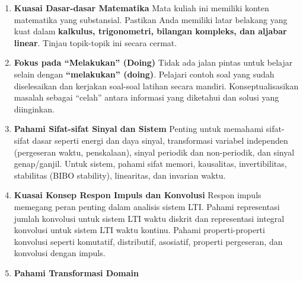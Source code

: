 \documentclass[
  letterpaper,
  DIV=11,
  numbers=noendperiod]{scrreprt}
\begin{document}
\begin{enumerate}
\def\labelenumi{\arabic{enumi}.}
\item
  \textbf{Kuasai Dasar-dasar Matematika} Mata kuliah ini memiliki konten
  matematika yang substansial. Pastikan Anda memiliki latar belakang
  yang kuat dalam \textbf{kalkulus, trigonometri, bilangan kompleks, dan
  aljabar linear}. Tinjau topik-topik ini secara cermat.
\item
  \textbf{Fokus pada ``Melakukan'' (Doing)} Tidak ada jalan pintas untuk
  belajar selain dengan \textbf{``melakukan'' (doing)}. Pelajari contoh
  soal yang sudah diselesaikan dan kerjakan soal-soal latihan secara
  mandiri. Konseptualisasikan masalah sebagai ``celah'' antara informasi
  yang diketahui dan solusi yang diinginkan.
\item
  \textbf{Pahami Sifat-sifat Sinyal dan Sistem} Penting untuk memahami
  sifat-sifat dasar seperti energi dan daya sinyal, transformasi
  variabel independen (pergeseran waktu, penskalaan), sinyal periodik
  dan non-periodik, dan sinyal genap/ganjil. Untuk sistem, pahami sifat
  memori, kausalitas, invertibilitas, stabilitas (BIBO stability),
  linearitas, dan invarian waktu.
\item
  \textbf{Kuasai Konsep Respon Impuls dan Konvolusi} Respon impuls
  memegang peran penting dalam analisis sistem LTI. Pahami representasi
  jumlah konvolusi untuk sistem LTI waktu diskrit dan representasi
  integral konvolusi untuk sistem LTI waktu kontinu. Pahami
  properti-properti konvolusi seperti komutatif, distributif, asosiatif,
  properti pergeseran, dan konvolusi dengan impuls.
\item
  \textbf{Pahami Transformasi Domain}


\end{enumerate}
\end{document}

